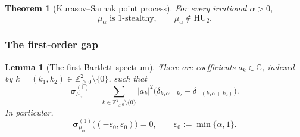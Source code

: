 \documentclass[11pt,reqno,a4paper]{amsart}
\numberwithin{equation}{section}
\theoremstyle{compact}
\newtheorem{theorem}{Theorem}[section]
\newtheorem{lemma}[lemma]{Lemma}
\theoremstyle{definition}
\theoremstyle{definition}
\newcommand{\HU}{\mathrm{HU}}
\begin{document}
\begin{theorem}[Kurasov--Sarnak point process]
\label{thm:ks-stealthy-not-hu2}
For every irrational $\alpha>0$,
\begin{equation}\label{eq:ks-main-conclusion}
  \mu_\alpha\text{ is $1$-stealthy},
  \qquad
  \mu_\alpha\notin\HU_2.
\end{equation}
\end{theorem}

\subsubsection{The first-order gap}

\begin{lemma}[The first Bartlett spectrum]
\label{lem:ks-first-bartlett}
There are coefficients $a_k\in\mathbb C$, indexed by
$k=(k_1,k_2)\in\mathbb Z_{\geq0}^2\setminus\{0\}$, such that
\begin{equation}\label{eq:ks-first-bartlett-explicit}
  \boldsymbol\sigma^{(1)}_{\mu_\alpha}
  =\sum_{k\in\mathbb Z_{\geq0}^2\setminus\{0\}}
     |a_k|^2
     \bigl(\delta_{k_1\alpha+k_2}
            +\delta_{-(k_1\alpha+k_2)}\bigr).
\end{equation}
In particular,
\begin{equation}\label{eq:ks-first-spectral-gap}
  \boldsymbol\sigma^{(1)}_{\mu_\alpha}
  \bigl((-\varepsilon_0,\varepsilon_0)\bigr)=0,
  \qquad
  \varepsilon_0:=\min\{\alpha,1\}.
\end{equation}
\end{lemma}
\end{document}
